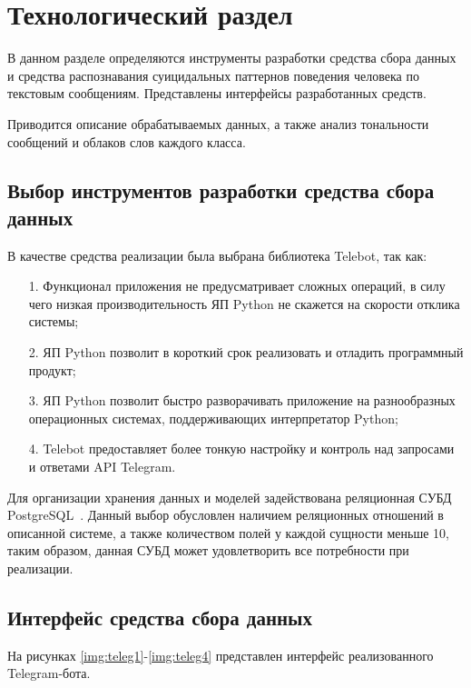 \section{Технологический раздел}

В данном разделе определяются инструменты разработки средства сбора данных и средства распознавания суицидальных паттернов поведения человека по текстовым сообщениям.
Представлены интерфейсы разработанных средств.

Приводится описание обрабатываемых данных, а также анализ тональности сообщений и облаков слов каждого класса.

\subsection{Выбор инструментов разработки средства сбора данных}

В качестве средства реализации была выбрана библиотека Telebot, так как:

\begin{enumerate}
	\item[1.] Функционал приложения не предусматривает сложных операций, в силу чего низкая производительность ЯП Python не скажется на скорости отклика системы;
	\item[2.] ЯП Python позволит в короткий срок реализовать и отладить программный продукт;
	\item[3.] ЯП Python позволит быстро разворачивать приложение на разнообразных операционных системах, поддерживающих интерпретатор Python;
	\item[4.] Telebot предоставляет более тонкую настройку и контроль над запросами и ответами API Telegram.
\end{enumerate}

Для организации хранения данных и моделей задействована реляционная СУБД PostgreSQL~\cite{postgres}. Данный выбор обусловлен наличием реляционных отношений в описанной системе, а также количеством полей у каждой сущности меньше 10, таким образом, данная СУБД может удовлетворить все потребности при реализации.

\subsection{Интерфейс средства сбора данных}

На рисунках \ref{img:teleg1}-\ref{img:teleg4} представлен интерфейс реализованного Telegram-бота.

